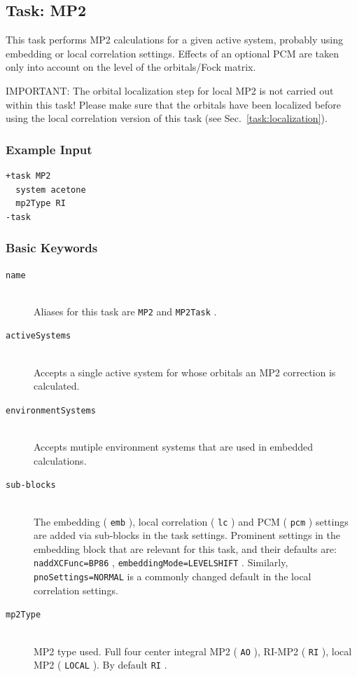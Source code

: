 \documentclass[bibliography=totocnumbered,a4paper,10pt,oneside]{scrbook}
\newcommand{\ttt}[1]{%
  \begingroup\setlength{\fboxsep}{1pt}%
  \colorbox{serenity-green!30}{\texttt{\hspace*{2pt}\vphantom{(g}#1\hspace*{2pt}}}%
  \endgroup
}
\begin{document}
\clearpage
\subsection{Task: MP2}
\label{sec:MP2}
This task performs MP2 calculations for a given active system, probably using embedding or local correlation
settings. Effects of an optional PCM are taken only into account on the level of the orbitals/Fock matrix.

{\color{red}IMPORTANT:} The orbital localization step for local MP2 is not carried out
within this task! Please make sure that the orbitals have been localized before using the local
correlation version of this task (see Sec.~\ref{task:localization}).
\subsubsection{Example Input}
\begin{lstlisting}
+task MP2
  system acetone
  mp2Type RI
-task
\end{lstlisting}
\subsubsection{Basic Keywords}
\begin{description}
	\item [\texttt{name}]\hfill \\
	Aliases for this task are \ttt{MP2} and \ttt{MP2Task}.
	\item [\texttt{activeSystems}]\hfill \\
	Accepts a single active system for whose orbitals an MP2 correction is calculated.
	\item [\texttt{environmentSystems}]\hfill \\
	Accepts mutiple environment systems that are used in embedded calculations.
	\item [\texttt{sub-blocks}]\hfill \\
	The embedding (\ttt{emb}), local correlation (\ttt{lc}) and PCM (\ttt{pcm}) settings are added via sub-blocks in the task settings.
	Prominent settings in the embedding block that are relevant for this task, and their defaults are:
	\ttt{naddXCFunc=BP86}, \ttt{embeddingMode=LEVELSHIFT}.
	Similarly, \ttt{pnoSettings=NORMAL} is a commonly changed default in the local correlation settings.
	\item [\texttt{mp2Type}] \hfill \\ 
	MP2 type used. Full four center integral MP2 (\ttt{AO}), RI-MP2 (\ttt{RI}), local MP2 (\ttt{LOCAL}). By default \ttt{RI}. 
\end{description}
\end{document}
